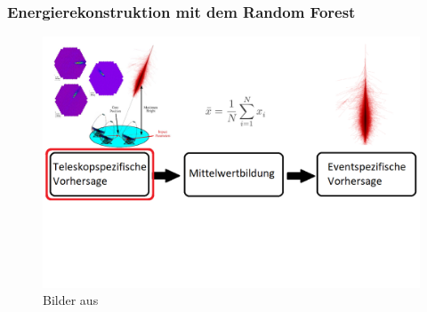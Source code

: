 \documentclass[aspectratio=1610, professionalfonts, 9pt]{beamer}
\begin{document}
  \begin{frame}
    \frametitle{Energierekonstruktion mit dem Random Forest}
    \begin{figure}
      \includegraphics[width=\textwidth]{pictures/Ablauf10.png}
      \caption{Bilder aus~\cite{ablauf}}
      \label{}
    \end{figure}
  \end{frame}
\end{document}
